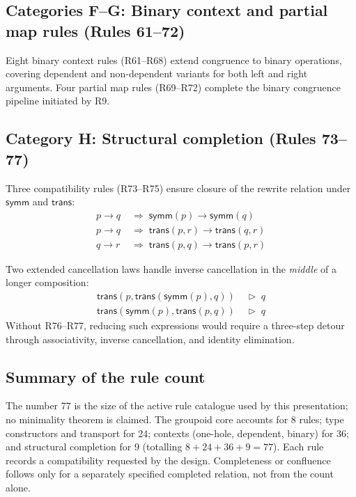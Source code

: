 \documentclass[manuscript]{BSLstyle}
\newcommand{\symm}{\mathsf{symm}}
\newcommand{\trans}{\mathsf{trans}}
\begin{document}
\subsection{Categories F--G: Binary context and partial map rules (Rules 61--72)}\label{ssec:cat-FG}

Eight binary context rules (R61--R68) extend congruence to binary
operations, covering dependent and non-dependent variants for both
left and right arguments.  Four partial map rules (R69--R72)
complete the binary congruence pipeline initiated by R9.

\subsection{Category H: Structural completion (Rules 73--77)}\label{ssec:cat-H}

Three compatibility rules (R73--R75) ensure closure of the rewrite
relation under $\symm$ and $\trans$:
\begin{align}
p \to q &\;\Longrightarrow\; \symm(p) \to \symm(q) \tag{R73} \\
p \to q &\;\Longrightarrow\; \trans(p, r) \to \trans(q, r) \tag{R74} \\
q \to r &\;\Longrightarrow\; \trans(p, q) \to \trans(p, r) \tag{R75}
\end{align}

Two extended cancellation laws handle inverse cancellation in the
\emph{middle} of a longer composition:
\begin{align}
\trans(p, \trans(\symm(p), q)) &\;\triangleright\; q \tag{R76} \\
\trans(\symm(p), \trans(p, q)) &\;\triangleright\; q \tag{R77}
\end{align}
Without R76--R77, reducing such expressions would require a three-step
detour through associativity, inverse cancellation, and identity
elimination.

\subsection{Summary of the rule count}

The number 77 is the size of the active rule catalogue used by this
presentation; no minimality theorem is claimed.
The groupoid core accounts for 8 rules; type constructors and transport for
24; contexts (one-hole, dependent, binary) for 36; and structural completion
for 9 (totalling $8 + 24 + 36 + 9 = 77$).
Each rule records a compatibility requested by the design.  Completeness or
confluence follows only for a separately specified completed relation, not
from the count alone.
\end{document}
